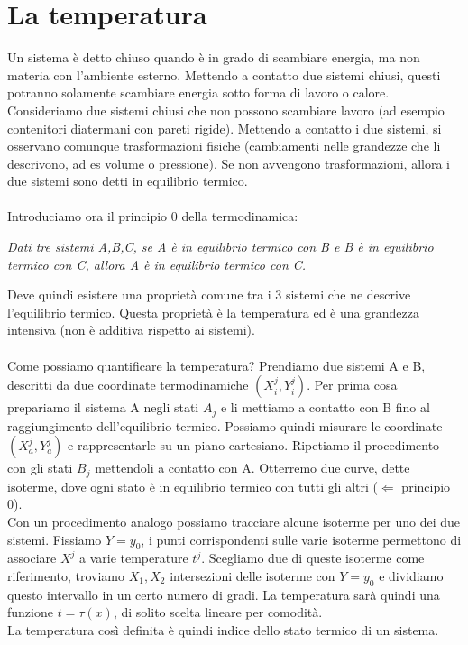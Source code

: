 \documentclass{article}
\begin{document}
\section{La temperatura}
Un sistema è detto chiuso quando è in grado di scambiare energia, ma non materia con l'ambiente esterno. Mettendo a contatto due sistemi chiusi, questi potranno solamente scambiare energia sotto forma di lavoro o calore.\\
Consideriamo due sistemi chiusi che non possono scambiare lavoro (ad esempio contenitori diatermani con pareti rigide). Mettendo a contatto i due sistemi, si osservano comunque trasformazioni fisiche (cambiamenti nelle grandezze che li descrivono, ad es volume o pressione). Se non avvengono trasformazioni, allora i due sistemi sono detti in equilibrio termico.\\\\
Introduciamo ora il principio 0 della termodinamica:
\begin{center}
    \textit{Dati tre sistemi A,B,C, se A è in equilibrio termico con B e B è in equilibrio termico con C, allora A è in equilibrio termico con C.}
\end{center}
Deve quindi esistere una proprietà comune tra i 3 sistemi che ne descrive l'equilibrio termico. Questa proprietà è la temperatura ed è una grandezza intensiva (non è additiva rispetto ai sistemi).\\\\
Come possiamo quantificare la temperatura? Prendiamo due sistemi A e B, descritti da due coordinate termodinamiche $(X_i^j,Y_i^j)$. Per prima cosa prepariamo il sistema A negli stati $A_j$ e li mettiamo a contatto con B fino al raggiungimento dell'equilibrio termico. Possiamo quindi misurare le coordinate $(X_a^j,Y_a^j)$ e rappresentarle su un piano cartesiano. Ripetiamo il procedimento con gli stati $B_j$ mettendoli a contatto con A. Otterremo due curve, dette isoterme, dove ogni stato è in equilibrio termico con tutti gli altri ($\Leftarrow$ principio 0).\\
Con un procedimento analogo possiamo tracciare alcune isoterme per uno dei due sistemi. Fissiamo $Y=y_0$, i punti corrispondenti sulle varie isoterme permettono di associare $X^j$ a varie temperature $t^j$. Scegliamo due di queste isoterme come riferimento, troviamo $X_1,X_2$ intersezioni delle isoterme con $Y=y_0$ e dividiamo questo intervallo in un certo numero di gradi. La temperatura sarà quindi una funzione $t=\tau(x)$, di solito scelta lineare per comodità.\\
La temperatura così definita è quindi indice dello stato termico di un sistema.
\end{document}
